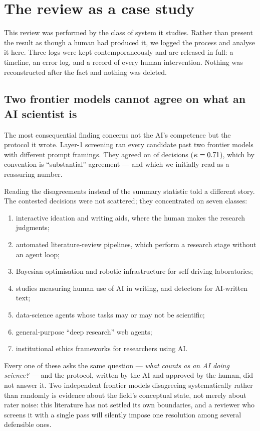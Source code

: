 \section{The review as a case study}
\label{sec:reflexive}

This review was performed by the class of system it studies. Rather than present the result
as though a human had produced it, we logged the process and analyse it here. Three logs were
kept contemporaneously and are released in full: a timeline, an error log, and a record of
every human intervention. Nothing was reconstructed after the fact and nothing was deleted.

\subsection{Two frontier models cannot agree on what an AI scientist is}

The most consequential finding concerns not the AI's competence but the protocol it wrote.
Layer-1 screening ran every candidate past two frontier models with different prompt framings.
They agreed on \rawAgree{} of \nScreened{} decisions ($\kappa = 0.71{}$), which by
convention is ``substantial'' agreement --- and which we initially read as a reassuring number.

Reading the disagreements instead of the summary statistic told a different story. The
\nAdjudicate{} contested decisions were not scattered; they concentrated on seven classes:

\begin{enumerate}\itemsep1pt
\item interactive ideation and writing aids, where the human makes the research judgments;
\item automated literature-review pipelines, which perform a research stage without an agent loop;
\item Bayesian-optimisation and robotic infrastructure for self-driving laboratories;
\item studies measuring human use of AI in writing, and detectors for AI-written text;
\item data-science agents whose tasks may or may not be scientific;
\item general-purpose ``deep research'' web agents;
\item institutional ethics frameworks for researchers using AI.
\end{enumerate}

Every one of these asks the same question --- \emph{what counts as an AI doing science?} ---
and the protocol, written by the AI and approved by the human, did not answer it. Two
independent frontier models disagreeing systematically rather than randomly is evidence about
the field's conceptual state, not merely about rater noise: this literature has not settled
its own boundaries, and a reviewer who screens it with a single pass will silently impose one
resolution among several defensible ones.

